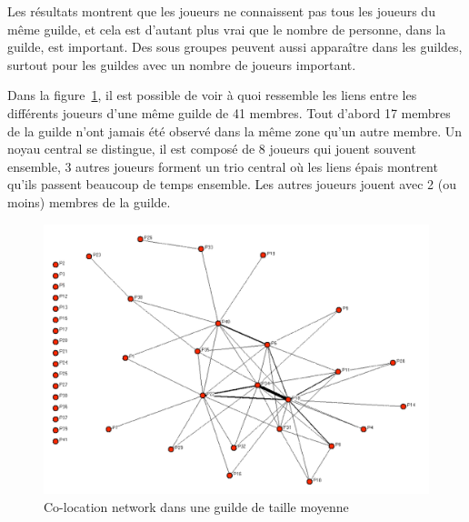 \documentclass[11pt,a4paper]{article}
\begin{document}
\par Les résultats montrent que les joueurs ne connaissent pas tous les joueurs du même guilde, et cela est d'autant plus vrai que le nombre de personne, dans la guilde, est important. Des sous groupes peuvent aussi apparaître dans les guildes, surtout pour les guildes avec un nombre de joueurs important. 
\par Dans la figure~\ref{co-location}, il est possible de voir à quoi ressemble les liens entre les différents joueurs d'une même guilde de 41 membres. Tout d'abord 17 membres de la guilde n'ont jamais été observé dans la même zone qu'un autre membre. Un noyau central se distingue, il est composé de 8 joueurs qui jouent souvent ensemble, 3 autres joueurs forment un trio central où les liens épais montrent qu'ils passent beaucoup de temps ensemble. Les autres joueurs jouent avec 2 (ou moins) membres de la guilde.
	 \begin{figure}[!h]
        \centering
        \includegraphics[scale=0.95]{./images/co-location.png}
        \caption{Co-location network dans une guilde de taille moyenne}
        \label{co-location}
        \end{figure}
\newpage

\end{document}

